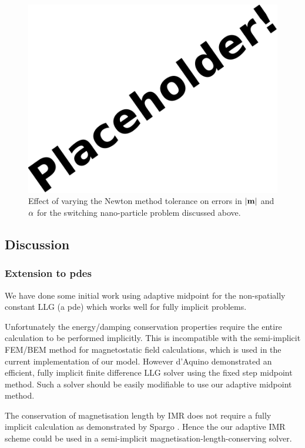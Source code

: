 \begin{figure}[ht!]
  \centering
  \includegraphics{images/placeholder}
  \caption{Effect of varying the Newton method tolerance on errors in $\lvert \mathbf{m} \rvert$ and $\alpha$  for the switching nano-particle problem discussed above.}
  \label{fig:newton-tol-errors-mp}
\end{figure}


\subsection{Discussion}

\subsubsection{Extension to pdes}

We have done some initial work using adaptive midpoint for the non-spatially constant LLG (\ie a pde) which works well for fully implicit problems.

Unfortunately the energy/damping conservation properties require the entire calculation to be performed implicitly.
This is incompatible with the semi-implicit FEM/BEM method for magnetostatic field calculations,\cite{Koehler1997} which is used in the current implementation of our model.
However d'Aquino \etal demonstrated an efficient, fully implicit finite difference LLG solver using the fixed step midpoint method\cite{DAquino2005}.
Such a solver should be easily modifiable to use our adaptive midpoint method.

The conservation of magnetisation length by IMR does not require a fully implicit calculation as demonstrated by Spargo \etal\cite{Spargo2003a}.
Hence the our adaptive IMR scheme could be used in a semi-implicit magnetisation-length-conserving solver.


